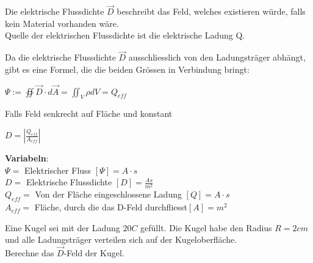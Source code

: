 \beginip
Die elektrische Flussdichte $\vec{D}$ beschreibt das Feld, welches existieren würde, falls kein Material vorhanden wäre. \\
Quelle der elektrischen Flussdichte ist die elektrische Ladung Q.
\iend

Da die elektrische Flussdichte  $\vec{D}$ ausschliesslich von den Ladungsträger abhängt,
gibt es eine Formel, die die beiden Grössen in Verbindung bringt:


\begingl
\begin{center}
	\formulaBegin
	$\Psi := \oiint \vec{D}\cdot d\vec{A} = \iint_V \rho dV = Q_{eff}$
	\formulaEnd

	Falls Feld senkrecht auf Fläche und konstant \\
	\fspace

	\formulaBegin
	$D = |\frac{Q_{eff}}{A_{eff}}|$
	\formulaEnd

\end{center}
\textbf{Variabeln}: \\
$\Psi = $ Elektrischer Fluss $ [\Psi] = A \cdot s $ \\
$D = $ Elektrische Flussdichte $ [D] = \frac{As}{m^2}$ \\
$ Q_{eff} = $ Von der Fläche eingeschlossene Ladung $[Q] = A\cdot s$ \\
$ A_{eff} = $ Fläche, durch die das D-Feld durchfliesst$ [A] = m^2$ \\

\iend

\beginbsp
Eine Kugel sei mit der Ladung $20 C$ gefüllt. Die Kugel habe den Radius $R = 2cm$ und alle Ladungsträger verteilen sich auf der Kugeloberfläche. \\
Berechne das $\vec{D}$-Feld der Kugel.
\iend


\newpage


